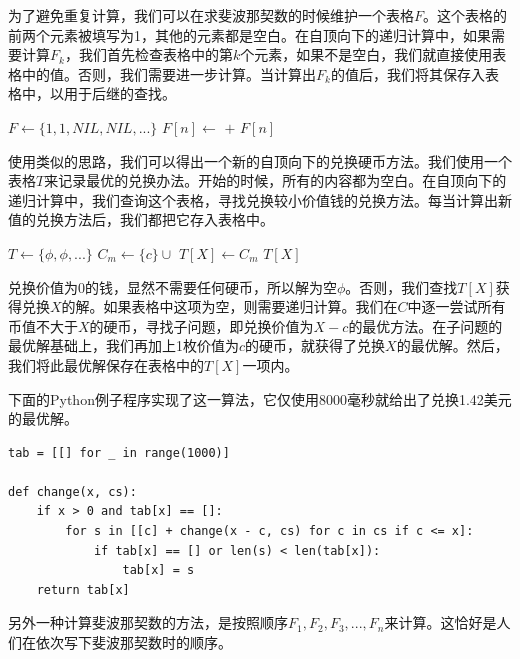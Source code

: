\documentclass[b5paper]{ctexart}
\begin{document}
为了避免重复计算，我们可以在求斐波那契数的时候维护一个表格$F$。这个表格的前两个元素被填写为1，其他的元素都是空白。在自顶向下的递归计算中，如果需要计算$F_k$，我们首先检查表格中的第$k$个元素，如果不是空白，我们就直接使用表格中的值。否则，我们需要进一步计算。当计算出$F_k$的值后，我们将其保存入表格中，以用于后继的查找。

\begin{algorithmic}[1]
\State $F \gets \{1, 1, NIL, NIL, ...\}$
    \State $F[n] \gets$  $+$ 
  \EndIf
  \State \Return $F[n]$
\EndFunction
\end{algorithmic}

使用类似的思路，我们可以得出一个新的自顶向下的兑换硬币方法。我们使用一个表格$T$来记录最优的兑换办法。开始的时候，所有的内容都为空白。在自顶向下的递归计算中，我们查询这个表格，寻找兑换较小价值钱的兑换方法。每当计算出新值的兑换方法后，我们都把它存入表格中。

\begin{algorithmic}[1]
\State $T \gets \{\phi, \phi, ...\}$
        \State $C_m \gets \{c\} \cup$ 
          \State $T[X] \gets C_m$
        \EndIf
      \EndIf
    \EndFor
  \EndIf
  \State \Return $T[X]$
\EndFunction
\end{algorithmic}

兑换价值为0的钱，显然不需要任何硬币，所以解为空$\phi$。否则，我们查找$T[X]$获得兑换$X$的解。如果表格中这项为空，则需要递归计算。我们在$C$中逐一尝试所有币值不大于$X$的硬币，寻找子问题，即兑换价值为$X-c$的最优方法。在子问题的最优解基础上，我们再加上1枚价值为$c$的硬币，就获得了兑换$X$的最优解。然后，我们将此最优解保存在表格中的$T[X]$一项内。

下面的Python例子程序实现了这一算法，它仅使用8000毫秒就给出了兑换1.42美元的最优解。

\lstset{language=Python}
\begin{lstlisting}
tab = [[] for _ in range(1000)]

def change(x, cs):
    if x > 0 and tab[x] == []:
        for s in [[c] + change(x - c, cs) for c in cs if c <= x]:
            if tab[x] == [] or len(s) < len(tab[x]):
                tab[x] = s
    return tab[x]
\end{lstlisting}

另外一种计算斐波那契数的方法，是按照顺序$F_1, F_2, F_3, ..., F_n$来计算。这恰好是人们在依次写下斐波那契数时的顺序。
\end{document}
